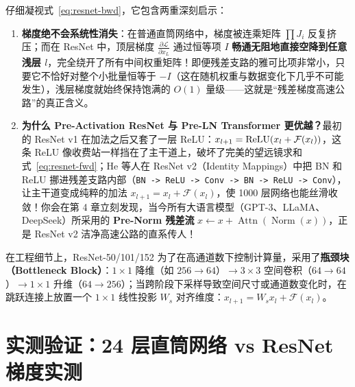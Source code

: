 仔细凝视式~\eqref{eq:resnet-bwd}，它包含两重深刻启示：
\begin{enumerate}
  \item \textbf{梯度绝不会系统性消失}：在普通直筒网络中，梯度被连乘矩阵 $\prod J_i$ 反复挤压；而在 ResNet 中，顶层梯度 $\frac{\partial \mathcal{L}}{\partial x_L}$ 通过恒等项 $I$ \textbf{畅通无阻地直接空降到任意浅层 $l$}，完全绕开了所有中间权重矩阵！即便残差支路的雅可比项非常小，只要它不恰好对整个小批量恒等于 $-I$（这在随机权重与数据变化下几乎不可能发生），浅层梯度就始终保持饱满的 $O(1)$ 量级——这就是“残差梯度高速公路”的真正含义。
  \item \textbf{为什么 Pre-Activation ResNet 与 Pre-LN Transformer 更优越？}最初的 ResNet v1 在加法之后又套了一层 ReLU：$x_{l+1} = \operatorname{ReLU}(x_l + \mathcal{F}(x_l))$，这条 ReLU 像收费站一样挡在了主干道上，破坏了完美的望远镜求和式~\eqref{eq:resnet-fwd}；He 等人在 ResNet v2（Identity Mappings）中把 BN 和 ReLU 挪进残差支路内部（\texttt{BN -> ReLU -> Conv -> BN -> ReLU -> Conv}），让主干道变成纯粹的加法 $x_{l+1} = x_l + \mathcal{F}(x_l)$，使 1000 层网络也能丝滑收敛！你会在第 4 章立刻发现，当今所有大语言模型（GPT-3、LLaMA、DeepSeek）所采用的 \textbf{Pre-Norm 残差流} $x \leftarrow x + \operatorname{Attn}(\operatorname{Norm}(x))$，正是 ResNet v2 洁净高速公路的直系传人！
\end{enumerate}

在工程细节上，ResNet-50/101/152 为了在高通道数下控制计算量，采用了\textbf{瓶颈块（Bottleneck Block）}：$1\times 1$ 降维（如 $256 \to 64$）$\to 3\times 3$ 空间卷积（$64 \to 64$）$\to 1\times 1$ 升维（$64 \to 256$）；当跨阶段下采样导致空间尺寸或通道数变化时，在跳跃连接上放置一个 $1\times 1$ 线性投影 $W_s$ 对齐维度：$x_{l+1} = W_s x_l + \mathcal{F}(x_l)$。

\section{实测验证：24 层直筒网络 vs ResNet 梯度实测}
\label{sec:exp-resnet}

